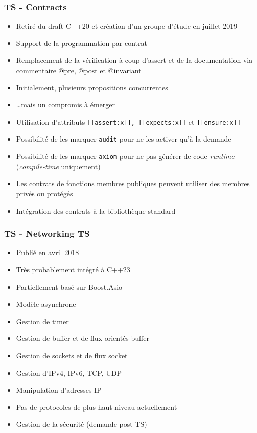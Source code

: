 \documentclass[C++.tex]{subfiles}
\begin{document}
\begin{frame}[fragile]
	\frametitle{TS - Contracts}
	\begin{itemize}
		\item Retiré du draft C++20 et création d'un groupe d'étude en juillet 2019


		\item Support de la programmation par contrat
		\item Remplacement de la vérification à coup d'assert et de la documentation via commentaire @pre, @post et @invariant
		\item Initialement, plusieurs propositions \og concurrentes\fg{}
		\item \ldots{}mais un compromis à émerger
		\item Utilisation d'attributs \lstinline|[[assert:x]], |\lstinline|[[expects:x]]| et \lstinline|[[ensure:x]]|


		\item Possibilité de les marquer \lstinline|audit| pour ne les activer qu'à la demande
		\item Possibilité de les marquer \lstinline|axiom| pour ne pas générer de code \textit{runtime} (\textit{compile-time} uniquement)
		\item Les contrats de fonctions membres publiques peuvent utiliser des membres privés ou protégés
		\item Intégration des contrats à la bibliothèque standard
	\end{itemize}
\end{frame}

\begin{frame}
	\frametitle{TS - Networking TS}
	\begin{itemize}
		\item Publié en avril 2018
		\item Très probablement intégré à C++23
		\item Partiellement basé sur Boost.Asio
		\item Modèle asynchrone
		\item Gestion de timer
		\item Gestion de buffer et de flux orientés buffer
		\item Gestion de sockets et de flux \og socket\fg{}
		\item Gestion d'IPv4, IPv6, TCP, UDP
		\item Manipulation d'adresses IP
		\item Pas de protocoles de plus haut niveau actuellement
		\item Gestion de la sécurité (demande post-TS)
	\end{itemize}
\end{frame}
\end{document}
